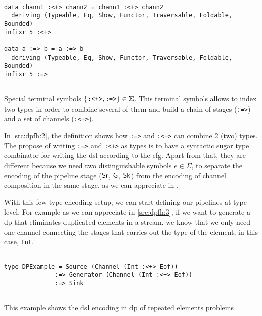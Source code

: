 \begin{listing}[htp!]
  \begin{verbatim}

data chann1 :<+> chann2 = chann1 :<+> chann2
  deriving (Typeable, Eq, Show, Functor, Traversable, Foldable, Bounded)
infixr 5 :<+>
   
data a :=> b = a :=> b
  deriving (Typeable, Eq, Show, Functor, Traversable, Foldable, Bounded)
infixr 5 :=>
   
  \end{verbatim}
  \caption[{[\texttt{Flow.hs}] $\Sigma$ enconding of $G_{dsl}$ - Especial non-terminals}]{Special terminal symbols $\{\text{\texttt{:<+>}}, \text{\texttt{:=>}}\} \in \Sigma$. This terminal symbols allows to index two types in order to combine several of them and build a chain of stages (\texttt{:=>}) and a set of channels (\texttt{:<+>}).}
  \label{src:dpfh:2}
\end{listing}

In \autoref{src:dpfh:2}, the definition shows how \texttt{:=>} and \texttt{:<+>} can combine 2 (two) types. 
The propose of writing \texttt{:=>} and \texttt{:<+>} as types is to have a syntactic sugar type combinator for writing the \acrshort{dsl} according to the \acrshort{cfg}. 
Apart from that, they are different because we need two distinguishable symbols $e \in \Sigma$, to separate the encoding of the pipeline stage ($\mathsf{Sr}$, $\mathsf{G}$, $\mathsf{Sk}$)
from the encoding of channel composition in the same stage, as we can appreciate in .

With this few type encoding setup, we can start defining our pipelines at type-level.  
For example as we can appreciate in \autoref{src:dpfh:3}, if we want to generate a \acrshort{dp} that eliminates duplicated elements in a stream, we know that we only need one channel connecting the stages that carries out the type of the element, in this case, \texttt{Int}.

\begin{listing}[htp!]
  \begin{verbatim}

type DPExample = Source (Channel (Int :<+> Eof)) 
              :=> Generator (Channel (Int :<+> Eof)) 
              :=> Sink
   
  \end{verbatim}
  \caption[{[\texttt{Repeated.hs} Example of \acrshort{dp} encoded in $G_{dsl}$}]{This example shows the \acrshort{dsl} encoding in \acrshort{dp} of repeated elements problems}
  \label{src:dpfh:3}
\end{listing}

